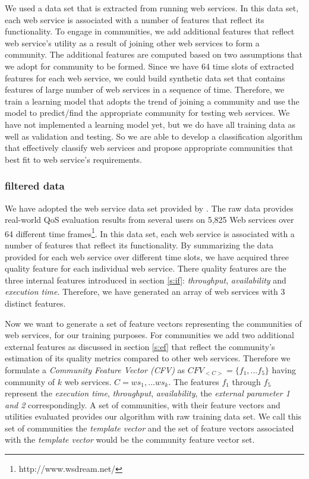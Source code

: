\documentclass[10pt,journal,cspaper,compsoc]{IEEEtran}
\begin{document}
We used a data set that is extracted from running web services. In this data set, each web service is associated with a number of features that reflect its functionality. To engage in communities, we add additional features that reflect web service’s utility as a result of joining other web services to form a community. The additional features are computed based on two assumptions that we adopt for community to be formed. Since we have 64 time slots of extracted features for each web service, we could build synthetic data set that contains features of large number of web services in a sequence of time. Therefore, we train a learning model that adopts the trend of joining a community and use the model to predict/find the appropriate community for testing web services. We have not implemented a learning model yet, but we do have all training data as well as validation and testing. So we are able to develop a classification algorithm that effectively classify web services and propose appropriate communities that best fit to web service’s requirements. 

\subsubsection{filtered data}\label{sss:filtereddata}

We have adopted the web service data set provided by \cite{10.1109/ISSRE.2011.17}. The raw data provides real-world QoS evaluation results from several users on 5,825 Web services over 64 different time frames\footnote{http://www.wsdream.net/}. In this data set, each web service is associated with a number of features that reflect its functionality. By summarizing the data provided for each web service over different time slots, we have acquired three quality feature for each individual web service. There quality features are the three internal features introduced in section \ref{s:if}: \emph{throughput}, \emph{availability} and \emph{execution time}. 
Therefore, we have generated an array of web services with 3 distinct features. 

Now we want to generate a set of feature vectors representing the communities of web services, for our training purposes. For communities we add two additional external features as discussed in section \ref{s:ef} that reflect the community's estimation of its quality metrics compared to other web services. Therefore we formulate a \emph{Community Feature Vector (CFV)} as $CFV_{<C>} = \{f_1,...f_5\}$ having community of $k$ web services. $C = {ws_1,...ws_k}$. The features $f_1$ through $f_5$ represent the \emph{execution time}, \emph{throughput}, \emph{availability}, the \emph{external parameter 1 and 2} correspondingly. A set of communities, with their feature vectors and utilities evaluated provides our algorithm with raw training data set. We call this set of communities the \emph{template vector} and the set of feature vectors associated with the \emph{template vector} would be the community feature vector set.
\end{document}
